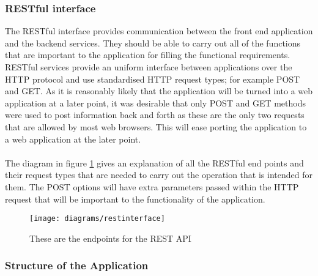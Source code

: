 \subsubsection{RESTful interface}

The RESTful interface provides communication between the front end application and the backend services. They should be able to carry out all of the functions that are important to the application for filling the functional requirements. RESTful services provide an uniform interface between applications over the HTTP protocol and use standardised HTTP request types; for example POST and GET. As it is reasonably likely that the application will be turned into a web application at a later point, it was desirable that only POST and GET methods were used to post information back and forth as these are the only two requests that are allowed by most web browsers. This will ease porting the application to a web application at the later point.\\
\\
The diagram in figure \ref{fig:rest_pai_diagram_image} gives an explanation of all the RESTful end points and their request types that are needed to carry out the operation that is intended for them. The POST options will have extra parameters passed within the HTTP request that will be important to the functionality of the application. 

\begin{figure}[H]
    \centering
    \texttt{[image: diagrams/restinterface]}
    \caption{These are the endpoints for the REST API}
    \label{fig:rest_pai_diagram_image}
\end{figure} 

\subsubsection{Structure of the Application}

